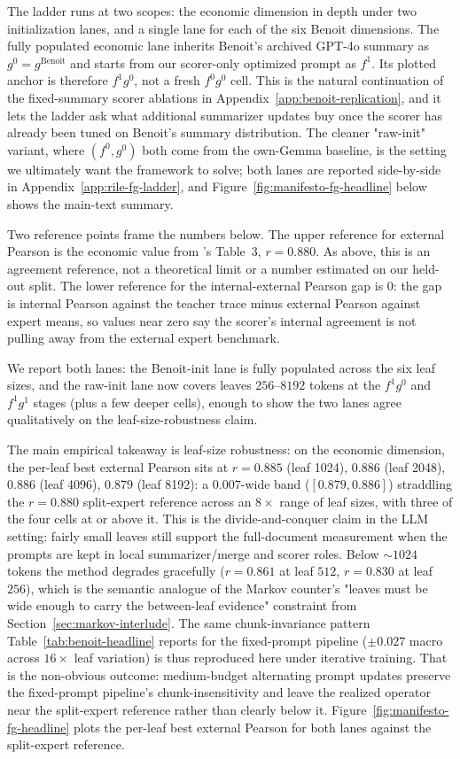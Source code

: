 The ladder runs at two scopes: the economic dimension in depth under
two initialization lanes, and a single lane for each of the six
Benoit dimensions. The fully populated economic lane inherits
Benoit's archived GPT-4o summary as $g^0 = g^{\mathrm{Benoit}}$ and
starts from our scorer-only optimized prompt as $f^1$. Its plotted anchor is therefore
$f^1 g^0$, not a fresh $f^0 g^0$ cell. This is the natural continuation
of the fixed-summary scorer ablations in Appendix~\ref{app:benoit-replication},
and it lets the ladder ask what additional summarizer updates buy once
the scorer has already been tuned on Benoit's summary distribution. The
cleaner "raw-init" variant, where $(f^0, g^0)$ both come from the
own-Gemma baseline, is the setting we ultimately want the framework to
solve; both lanes are reported side-by-side in
Appendix~\ref{app:rile-fg-ladder}, and
Figure~\ref{fig:manifesto-fg-headline} below shows the main-text summary.

Two reference points frame the numbers below. The upper reference for
external Pearson is the economic value from \citet{BenoitEtAl2025}'s
Table~3, $r = 0.880$. As above, this is an agreement reference, not a
theoretical limit or a number estimated on our held-out split. The
lower reference for the
internal-external Pearson gap is $0$: the gap is internal Pearson
against the teacher trace minus external Pearson against expert means,
so values near zero say the scorer's internal agreement is not pulling
away from the external expert benchmark.

We report both lanes: the Benoit-init lane is fully populated across
the six leaf sizes, and the raw-init lane now covers leaves
$256$--$8192$ tokens at the $f^1 g^0$ and $f^1 g^1$ stages (plus a few
deeper cells), enough to show the two lanes agree qualitatively on
the leaf-size-robustness claim.

The main empirical takeaway is leaf-size robustness: on the economic
dimension, the per-leaf best external Pearson sits at $r = 0.885$
(leaf 1024), $0.886$ (leaf 2048), $0.886$ (leaf 4096), $0.879$ (leaf
8192): a $0.007$-wide band ($[0.879, 0.886]$) straddling the
$r = 0.880$ split-expert reference across an $8\times$ range of
leaf sizes, with three of the four cells at or above it. This is the
divide-and-conquer claim in the LLM setting: fairly small leaves still
support the full-document measurement when the prompts are kept in
local summarizer/merge and scorer roles.
Below $\sim 1024$ tokens the method degrades gracefully
($r = 0.861$ at leaf $512$, $r = 0.830$ at leaf $256$), which is the
semantic analogue of the Markov counter's "leaves must be wide enough
to carry the between-leaf evidence" constraint from
Section~\ref{sec:markov-interlude}. The same chunk-invariance pattern
Table~\ref{tab:benoit-headline} reports for the fixed-prompt pipeline
($\pm 0.027$ macro across $16\times$ leaf variation) is thus
reproduced here under iterative training. That is the non-obvious
outcome: medium-budget alternating prompt updates preserve the
fixed-prompt pipeline's chunk-insensitivity and leave the realized
operator near the split-expert reference rather than clearly below it.
Figure~\ref{fig:manifesto-fg-headline} plots the per-leaf best external
Pearson for both lanes against the split-expert reference.

